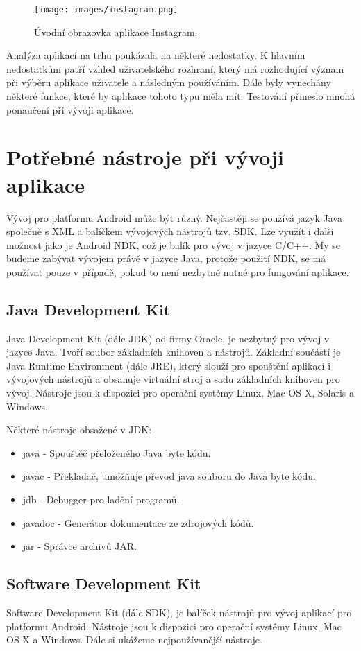 \documentclass[12pt]{article}
\begin{document}
\begin{figure}[ht]
\centerline{\texttt{[image: images/instagram.png]}}
\caption{Úvodní obrazovka aplikace Instagram.} \label{insta}
\end{figure}
\newpage
Analýza aplikací na trhu poukázala na některé nedostatky. K hlavním nedostatkům patří vzhled uživatelského rozhraní, který má rozhodující význam při výběru aplikace uživatele a následným používáním. Dále byly vynechány některé funkce, které by aplikace tohoto typu měla mít. Testování přineslo mnohá ponaučení při vývoji aplikace.

\newpage
\section{Potřebné nástroje při vývoji aplikace}
Vývoj pro platformu Android může být různý. Nejčastěji se používá jazyk Java společně s XML a balíčkem vývojových nástrojů tzv. SDK. Lze využít i další možnost jako je Android NDK, což je balík pro vývoj v jazyce C/C++. My se budeme zabývat vývojem právě v jazyce Java, protože použití NDK, se má používat pouze v případě, pokud to není nezbytně nutné pro fungování aplikace.
\subsection{Java Development Kit}
Java Development Kit (dále JDK) od firmy Oracle, je nezbytný pro vývoj v jazyce Java. Tvoří soubor základních knihoven a nástrojů. Základní součástí je Java Runtime Environment (dále JRE), který slouží pro spouštění aplikací i vývojových nástrojů a obsahuje virtuální stroj a sadu základních knihoven pro vývoj. Nástroje jsou k dispozici pro operační systémy  Linux, Mac OS X, Solaris a Windows.

Některé nástroje obsažené v JDK:
\begin{itemize}
\item java - Spouštěč přeloženého Java byte kódu.
\item javac - Překladač, umožňuje převod  java souboru do Java byte kódu.
\item jdb - Debugger pro ladění programů.
\item javadoc - Generátor dokumentace ze zdrojových kódů.
\item jar - Správce archivů JAR.
\end{itemize}
\subsection{Software Development Kit}
Software Development Kit (dále SDK), je balíček nástrojů pro vývoj aplikací pro platformu Android. Nástroje jsou k dispozici pro operační systémy  Linux, Mac OS X a Windows. Dále si ukážeme nejpoužívanější nástroje.
\newpage
\end{document}
